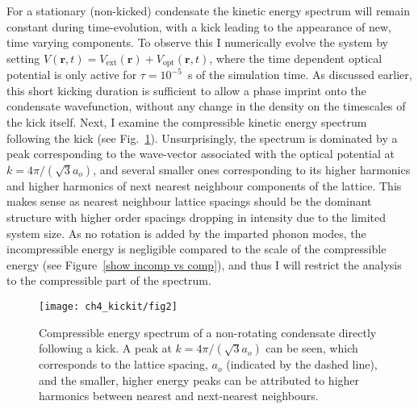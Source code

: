 For a stationary (non-kicked) condensate the kinetic energy spectrum will remain constant during time-evolution, with a kick leading to the appearance of new, time varying components. To observe this I numerically evolve the system by setting $V(\mathbf{r},t) = V_{\text{ext}}(\mathbf{r}) + V_{\text{opt}}(\mathbf{r},t)$, where the time dependent optical potential is only active for $\tau=10^{-5}$~s of the simulation time. As discussed earlier, this short kicking duration is sufficient to allow a phase imprint onto the condensate wavefunction, without any change in the density on the timescales of the kick itself. Next, I examine the compressible kinetic energy spectrum following the kick (see Fig.~\ref{fig:ekc_eki_novtx}). Unsurprisingly, the spectrum is dominated by a peak corresponding to the wave-vector associated with the optical potential at $k=4\pi/(\sqrt{3}a_o)$, and several smaller ones corresponding to its higher harmonics and higher harmonics of next nearest neighbour components of the lattice. This makes sense as nearest neighbour lattice spacings should be the dominant structure with higher order spacings dropping in intensity due to the limited system size. As no rotation is added by the imparted phonon modes, the incompressible energy is negligible compared to the scale of the compressible energy (see Figure~\ref{show incomp vs comp}), and thus I will restrict the analysis to the compressible part of the spectrum.

\begin{figure}[tb]
    \texttt{[image: ch4\_kickit/fig2]}
    \caption{Compressible energy spectrum of a non-rotating condensate directly following a kick. A peak at $k=4\pi/(\sqrt{3}a_o)$ can be seen, which corresponds to the lattice spacing, $a_o$ (indicated by the dashed line), and the smaller, higher energy peaks can be attributed to higher harmonics between nearest and next-nearest neighbours.}
    \label{fig:ekc_eki_novtx}
\end{figure}



